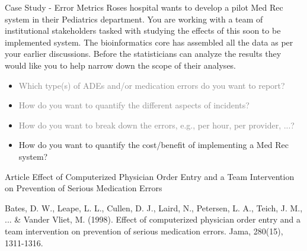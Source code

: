 \documentclass[10pt]{beamer}
\begin{document}
\begin{frame}{Case Study - Error Metrics}
	Roses hospital wants to develop a pilot Med Rec system in their Pediatrics department.  You are working with a team of institutional stakeholders tasked with studying the effects of this soon to be implemented system.  The bioinformatics core has assembled all the data as per your earlier discussions.  Before the statisticians can analyze the results they would like you to help narrow down the scope of their analyses.
	\begin{itemize}
		\item \textcolor<2->{gray}{Which type(s) of ADEs and/or medication errors do you want to report?}
		\item \textcolor<2->{gray}{How do you want to quantify the different aspects of incidents?}
		\item \textcolor<2->{gray}{How do you want to break down the errors, e.g., per hour, per provider, ...?}
		\item<2-> How do you want to quantify the cost/benefit of implementing a Med Rec system?
	\end{itemize}	 
\end{frame}


\begin{frame}{Article}
	\Large{Effect of Computerized Physician Order Entry and a Team Intervention on Prevention of Serious Medication Errors}
	
	
	\scriptsize{Bates, D. W., Leape, L. L., Cullen, D. J., Laird, N., Petersen, L. A., Teich, J. M., ... \& Vander Vliet, M. (1998). Effect of computerized physician order entry and a team intervention on prevention of serious medication errors. Jama, 280(15), 1311-1316.}
\end{frame}
\end{document}

